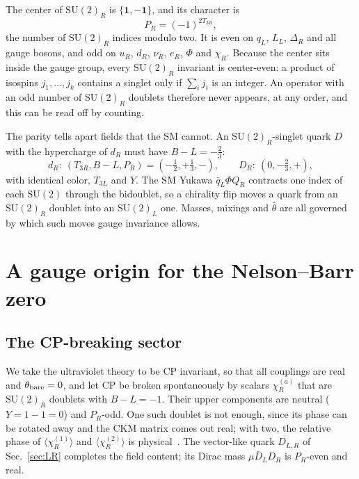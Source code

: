 \documentclass[submission, Phys]{SciPost}
\newcommand{\SU}{\mathrm{SU}}
\newcommand{\bt}{\bar\theta}
\newcommand{\PR}{P_R}
\newcommand{\vev}[1]{\langle #1\rangle}
\newcommand{\one}{\mathbf 1}
\begin{document}
The center of $\SU(2)_R$ is $\{\one,-\one\}$, and its character is
\begin{equation}
  \PR=(-1)^{2T_{3R}},
  \label{eq:Pw}
\end{equation}
the number of $\SU(2)_R$ indices modulo two. It is even on $q_L$, $L_L$,
$\Delta_R$ and all gauge bosons, and odd on $u_R$, $d_R$, $\nu_R$, $e_R$,
$\Phi$ and $\chi_R$. Because the center sits inside the gauge group,
every $\SU(2)_R$ invariant is center-even: a product of isospins
$j_1,\dots,j_k$ contains a singlet only if $\sum_ij_i$ is an integer.
An operator with an odd number of $\SU(2)_R$ doublets therefore never
appears, at any order, and this can be read off by counting.

The parity tells apart fields that the SM cannot. An $\SU(2)_R$-singlet
quark $D$ with the hypercharge of $d_R$ must have $B-L=-\tfrac23$:
\begin{equation}
  d_R:\ (T_{3R},B-L,\PR)=(-\tfrac12,+\tfrac13,-),
  \qquad
  D_R:\ (0,-\tfrac23,+),
\end{equation}
with identical color, $T_{3L}$ and $Y$. The SM Yukawa
$\bar q_L\Phi Q_R$ contracts one index of each $\SU(2)$ through the
bidoublet, so a chirality flip moves a quark from an $\SU(2)_R$ doublet
into an $\SU(2)_L$ one. Masses, mixings and $\bt$ are all governed by
which such moves gauge invariance allows.

\section{A gauge origin for the Nelson--Barr zero}
\label{sec:strongCP}

\subsection{The CP-breaking sector}
\label{sec:layer1}

We take the ultraviolet theory to be CP invariant, so that all
couplings are real and $\theta_{\rm bare}=0$, and let CP be broken
spontaneously by scalars $\chi_R^{(a)}$ that are $\SU(2)_R$ doublets
with $B-L=-1$. Their upper components are neutral ($Y=1-1=0$) and
$\PR$-odd. One such doublet is not enough, since its phase can be
rotated away and the CKM matrix comes out real; with two, the relative
phase of $\vev{\chi^{(1)}_R}$ and $\vev{\chi^{(2)}_R}$ is
physical~\cite{valenti_2021:JHEP}. The vector-like quark $D_{L,R}$ of
Sec.~\ref{sec:LR} completes the field content; its Dirac mass
$\mu\bar D_LD_R$ is $\PR$-even and real.
\end{document}
